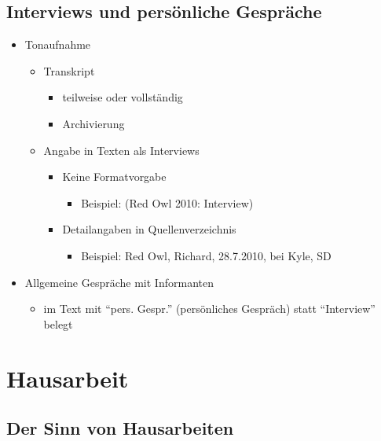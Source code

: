 \documentclass[ 12pt,
                titlepage,
                parskip=half,
                version=first,
                bibliography=totocnumbered,
                final,
                listof=totoc]{scrartcl}
\begin{document}
\subsection{Interviews und persönliche Gespräche}

\begin{itemize}
    \item Tonaufnahme
\begin{itemize}
    \item Transkript
\begin{itemize}
        \item teilweise oder vollständig
    \item Archivierung
\end{itemize}
    \item Angabe in Texten als Interviews
\begin{itemize}
    \item Keine Formatvorgabe
\begin{itemize}
    \item Beispiel: (Red Owl 2010: Interview)
\end{itemize}
    \item Detailangaben in Quellenverzeichnis
\begin{itemize}
    \item Beispiel: Red Owl, Richard, 28.7.2010, bei Kyle, SD
\end{itemize}
\end{itemize}
\end{itemize}
    \item Allgemeine Gespräche mit Informanten
\begin{itemize}
    \item im Text mit \enquote{pers. Gespr.} (persönliches Gespräch) statt
    \enquote{Interview} belegt
\end{itemize}
\end{itemize}

\section{Hausarbeit}

\subsection{Der Sinn von Hausarbeiten}
\end{document}
